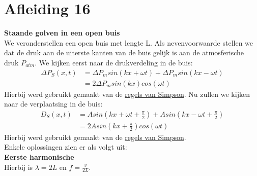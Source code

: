 \documentclass[a4paper,kul]{kulakarticle} %
\begin{document}
\section{Afleiding 16}
\textbf{Staande golven in een open buis}\\
We veronderstellen een open buis met lengte L. Als nevenvoorwaarde stellen we dat de druk aan de uiterste kanten van de buis gelijk is aan de atmosferische druk $P_{atm}$. We kijken eerst naar de drukverdeling in de buis:
\begin{align*}
	\Delta P_S (x,t) &= \Delta P_m sin(kx+\omega t) + \Delta P_m sin(kx-\omega t)\\
	&= 2\Delta P_m sin(kx)cos(\omega t)
\end{align*}
Hierbij werd gebruikt gemaakt van de \href{https://nl.wikipedia.org/wiki/Lijst_van_goniometrische_gelijkheden#Som-naar-product-identiteiten_(regels_van_Simpson)}{regels van Simpson}. Nu zullen we kijken naar de verplaatsing in de buis:
\begin{align*}
	D_S(x,t)&=Asin(kx+\omega t+\frac{\pi}{2})+Asin(kx-\omega t+\frac{\pi}{2})\\
	&= 2Asin(kx+\frac{\pi}{2})cos(\omega t)
\end{align*}
Hierbij werd gebruikt gemaakt van de \href{https://nl.wikipedia.org/wiki/Lijst_van_goniometrische_gelijkheden#Som-naar-product-identiteiten_(regels_van_Simpson)}{regels van Simpson}.\\
Enkele oplossingen zien er als volgt uit:\\

\textbf{Eerste harmonische}\\
Hierbij is $\lambda = 2L$ en $f=\frac{v}{2L}$.
\end{document}
